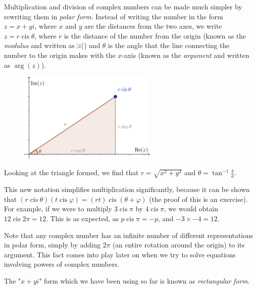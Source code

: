 \documentclass[a4paper,10pt,titlepage]{article}
\theoremstyle{definition}
\DeclareMathOperator{\cis}{cis}
\DeclareMathOperator{\carg}{arg}
\begin{document}
Multiplication and division of complex numbers can be made much simpler by rewriting them
in \emph{polar form}. Instead of writing the number in the form $ z = x + yi $, where $ x $ and $ y $
are the distances from the two axes, we write $ z = r \cis \theta $, where $ r $ is the distance
of the number from the origin (known as the \emph{modulus} and written as $ \abs{z} $) and $ \theta $
is the angle that the line connecting the number to the origin makes with the $ x$-axis (known as
the \emph{argument} and written as $ \carg(z) $).

\begin{figure}[h]
  \begin{center}
    \includegraphics[width=0.6\textwidth]{polarnew}
  \end{center}
\end{figure}

Looking at the triangle formed, we find that $ r = \sqrt{x^2 + y^2} $ and $ \theta = \tan^{-1}{\frac{b}{a}} $.

This new notation simplifies multiplication significantly, because it can be shown
that $ (r \cis \theta)(t \cis \varphi) = (rt) \cis (\theta + \varphi) $ (the proof of this
is an exercise). For example, if we were to multiply $ 3 \cis \pi $ by $ 4 \cis \pi $, we
would obtain $ 12 \cis 2\pi = 12 $. This is as expected, as $ p \cis \pi = -p $, and $ -3 \times -4 = 12 $.

Note that any complex number has an infinite number of different representations in polar
form, simply by adding $ 2\pi $ (an entire rotation around the origin) to its argument. This
fact comes into play later on when we try to solve equations involving powers of complex
numbers.

The "$ x + yi $" form which we have been using so far is known as \emph{rectangular form}.
\end{document}
